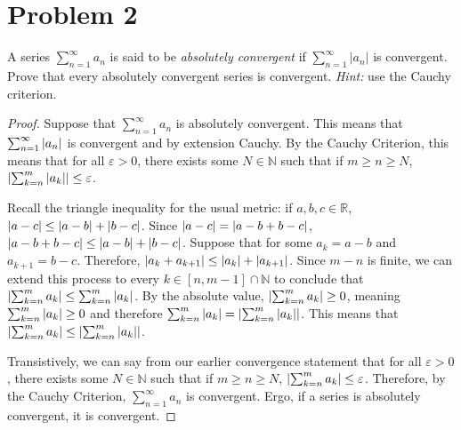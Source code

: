 \documentclass[11pt]{article}
\begin{document}
\section{Problem 2}
    A series $\sum_{n = 1}^{\infty} a_n$ is said to be \textit{absolutely convergent} if $\sum_{n = 1}^{\infty} |a_n|$ is convergent. Prove that every absolutely convergent series is convergent. \textit{Hint:} use the Cauchy criterion.
    \begin{proof}
        Suppose that $\sum_{n=1}^{\infty} a_n$ is absolutely convergent.
        This means that $\sum_{n=1}^{\infty} \left| a_n \right|$ is convergent and by extension Cauchy.
        By the Cauchy Criterion, this means that for all $\varepsilon > 0$, there exists some $N \in \mathbb{N}$ such that if $m \geq n \geq N$, $\left| \sum_{k=n}^{m} \left| a_k \right| \right| \leq \varepsilon$.

        Recall the triangle inequality for the usual metric: if $a, b, c \in \mathbb{R}$, $\left| a - c \right| \leq \left| a - b \right| + \left| b - c \right|$.
        Since $\left| a - c \right| = \left| a - b + b - c \right|$, $\left| a - b + b - c \right| \leq \left| a - b \right| + \left| b - c \right|$.
        Suppose that for some $a_k = a - b$ and $a_{k+1} = b - c$.
        Therefore, $\left| a_k + a_{k + 1} \right| \leq \left| a_k \right| + \left| a_{k+1} \right|$.
        Since $m - n$ is finite, we can extend this process to every $k \in [n,m-1] \cap \mathbb{N}$ to conclude that $\left| \sum_{k=n}^{m} a_k \right| \leq \sum_{k=n}^{m} \left| a_k \right|$.
        By the absolute value, $\left| \sum_{k=n}^{m} a_k \right| \geq 0$, meaning $\sum_{k=n}^{m} \left| a_k \right| \geq 0$ and therefore $\sum_{k=n}^{m} \left| a_k \right| = \left| \sum_{k=n}^{m} \left| a_k \right| \right|$.
        This means that $\left| \sum_{k=n}^{m} a_k \right| \leq \left| \sum_{k=n}^{m} \left| a_k \right| \right|$.

        Transistively, we can say from our earlier convergence statement that for all $\varepsilon > 0$, there exists some $N \in \mathbb{N}$ such that if $m \geq n \geq N$, $\left| \sum_{k=n}^{m} a_k \right| \leq \varepsilon$.
        Therefore, by the Cauchy Criterion, $\sum_{n = 1}^{\infty} a_n$ is convergent.
        Ergo, if a series is absolutely convergent, it is convergent.
    \end{proof}

\pagebreak
\end{document}
